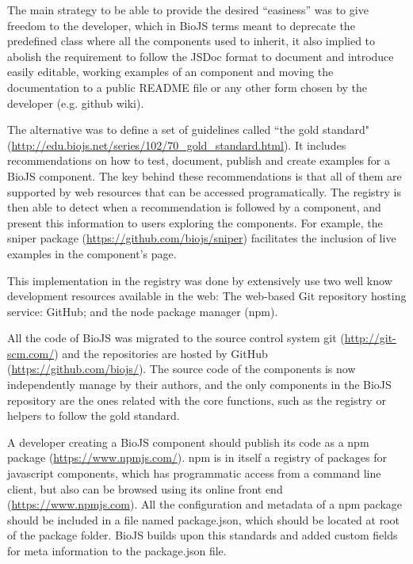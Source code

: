 The main strategy to be able to provide the desired ``easiness'' was to give freedom to the developer, which in BioJS terms meant to deprecate the predefined class where all the components used to inherit, it also implied to abolish the requirement to follow the JSDoc format to document and introduce easily editable, working examples of an component and moving the documentation to a public README file or any other form chosen by the developer (e.g. github wiki).

The alternative was to define a set of guidelines called ``the gold standard" (\url{http://edu.biojs.net/series/102/70_gold_standard.html}). It includes recommendations on how to test, document, publish and create examples for a BioJS component. The key behind these recommendations is that all of them are supported by web resources that can be accessed programatically. The registry is then able to detect when a recommendation is followed by a component, and present this information to users exploring the components. For example, the sniper package (\url{https://github.com/biojs/sniper}) facilitates the inclusion of live examples in the component's page.

This implementation in the registry was done by extensively use two well know development resources available in the web: The web-based Git repository hosting service: GitHub; and the node package manager (npm). 

All the code of BioJS was migrated to the source control system git (\url{http://git-scm.com/}) and the repositories are hosted by GitHub (\url{https://github.com/biojs/}). The source code of the components is now independently manage by their authors, and the only components in the BioJS repository are the ones related with the core functions, such as the registry or helpers to follow the gold standard.

A developer creating a BioJS component should publish its code as a npm package (\url{https://www.npmjs.com/}). npm is in itself a registry of packages for javascript components, which has programmatic access from a command line client, but also can be browsed using its online front end (\url{https://www.npmjs.com}). All the configuration and metadata of a npm package should be included in a file named package.json, which should be located at root of the package folder. BioJS builds upon this standards and added custom fields for meta information to the package.json file.


